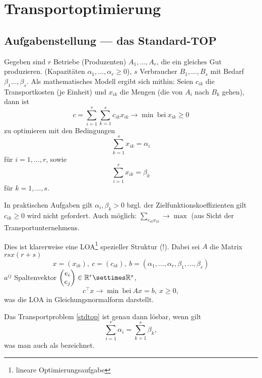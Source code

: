 \section{Transportoptimierung}
    \subsection{Aufgabenstellung --- das Standard-TOP}%

    \begin{definition}
        Gegeben sind $r$ Betriebe (Produzenten) $A_1,\ldots,A_r$, die ein gleiches Gut produzieren.
        (Kapazitäten $\alpha_1,\ldots,\alpha_r\geq 0$), $s$ Verbraucher $B_1,\ldots,B_s$ mit Bedarf $\beta_1\ldots,\beta_s$.
        Als mathematisches Modell ergibt sich mithin:
        Seien $c_{ik}$ die Transportkosten (je Einheit) und $x_{ik}$ die Mengen (die von $A_i$ nach $B_k$ gehen), dann ist 
        $$
        c=\sum_{i=1}^r\sum_{k=1}^s{c_{ik}x_{ik}}\to \min\ \textrm{bei}\ x_{ik}\geq 0\label{stdtop}
        $$
        zu optimieren mit den Bedingungen
        $$
        \sum_{k=1}^s{x_{ik}}=\alpha_i
        $$
        für $i=1,\ldots,r$, sowie
        $$
        \sum_{i=1}^r{x_{ik}}=\beta_k
        $$
        für $k=1,\ldots,s$.
    \end{definition}

    \begin{remark}
        In praktischen Aufgaben gilt $\alpha_i,\beta_k>0$ bzgl. der Zielfunktionskoeffizienten gilt
        $c_{ik}\geq 0$ wird nicht gefordert. Auch möglich: $\sum_{c_{ik}x_{ik}}\to \max$ (aus Sicht der Transportunternehmens.
    \end{remark}

    Dies ist klarerweise eine LOA\footnote{lineare Optimierungsaufgabe} spezieller Struktur (!).
    Dabei sei $A$ die Matrix $r s x(r+s)$
    $$
    x = (x_{ik}),\ c=(c_{ik}),\ b=(\alpha_1,\ldots,\alpha_r,\beta_1,\ldots,\beta_r)
    $$
    $a^{ij}$ Spaltenvektor $
    \begin{pmatrix}
        e_i\\
        e_j
    \end{pmatrix}
    \in\reals^r\settimes\reals^s$, 
    $$
    c^\top x\to\min\ \textrm{bei}\ Ax=b,\ x\geq 0,\label{stdtopgnf}
    $$
    was die LOA in Gleichungsnormalform darstellt.

    \begin{theorem}\label{top-lbkt}
        Das Transportproblem \autoref{stdtop} ist genau dann lösbar, wenn gilt
        $$
        \sum_{i=1}^r{\alpha_i}=\sum_{k=1}^s{\beta_k} \label{sbed},
        $$
        was man auch als  bezeichnet.
    \end{theorem}

